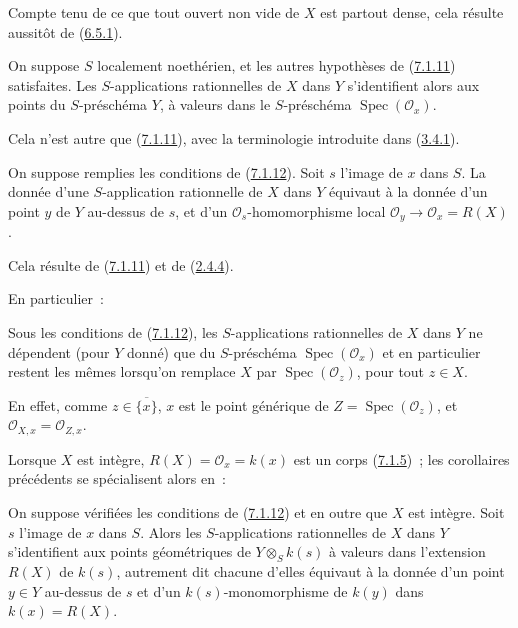 Compte tenu de ce que tout ouvert non vide de $X$ est partout dense, cela
résulte aussitôt de (\hyperref[I.6.5.1-fr]{6.5.1}).

\begin{corollary}[7.1.12]
\label{I.7.1.12-fr}
On suppose $S$ localement noethérien, et les autres hypothèses de
(\hyperref[I.7.1.11-fr]{7.1.11}) satisfaites. Les $S$-applications rationnelles
de $X$ dans $Y$ s'identifient alors aux points du $S$-préschéma $Y$, à valeurs
dans le $S$-préschéma $\operatorname{Spec}(\mathscr{O}_x)$.
\end{corollary}

Cela n'est autre que (\hyperref[I.7.1.11-fr]{7.1.11}), avec la terminologie
introduite dans (\hyperref[I.3.4.1-fr]{3.4.1}).

\begin{corollary}[7.1.13]
\label{I.7.1.13-fr}
On suppose remplies les conditions de (\hyperref[I.7.1.12-fr]{7.1.12}). Soit
$s$ l'image de $x$ dans $S$. La donnée d'une $S$-application rationnelle de
$X$ dans $Y$ équivaut à la donnée d'un point $y$ de $Y$ au-dessus de $s$, et
d'un $\mathscr{O}_s$-homomorphisme local
$\mathscr{O}_y\to\mathscr{O}_x=R(X)$.
\end{corollary}

Cela résulte de (\hyperref[I.7.1.11-fr]{7.1.11}) et de
(\hyperref[I.2.4.4-fr]{2.4.4}).

En particulier~:

\begin{corollary}[7.1.14]
\label{I.7.1.14-fr}
Sous les conditions de (\hyperref[I.7.1.12-fr]{7.1.12}), les $S$-applications
rationnelles de $X$ dans $Y$ ne dépendent (pour $Y$ donné) que du
$S$-préschéma $\operatorname{Spec}(\mathscr{O}_x)$ et en particulier restent
les mêmes lorsqu'on remplace $X$ par
$\operatorname{Spec}(\mathscr{O}_z)$, pour tout $z\in X$.
\end{corollary}

En effet, comme $z\in\overline{\{x\}}$, $x$ est le point générique de
$Z=\operatorname{Spec}(\mathscr{O}_z)$, et
$\mathscr{O}_{X,x}=\mathscr{O}_{Z,x}$.

Lorsque $X$ est intègre, $R(X)=\mathscr{O}_x=k(x)$ est un corps
(\hyperref[I.7.1.5-fr]{7.1.5})~; les corollaires précédents se spécialisent
alors en~:

\begin{corollary}[7.1.15]
\label{I.7.1.15-fr}
On suppose vérifiées les conditions de (\hyperref[I.7.1.12-fr]{7.1.12}) et en
outre que $X$ est intègre. Soit $s$ l'image de $x$ dans $S$. Alors les
$S$-applications rationnelles de $X$ dans $Y$ s'identifient aux points
géométriques de $Y\otimes_S k(s)$ à valeurs dans l'extension $R(X)$ de $k(s)$,
autrement dit chacune d'elles équivaut à la donnée d'un point $y\in Y$
au-dessus de $s$ et d'un $k(s)$-monomorphisme de $k(y)$ dans
$k(x)=R(X)$.
\end{corollary}

